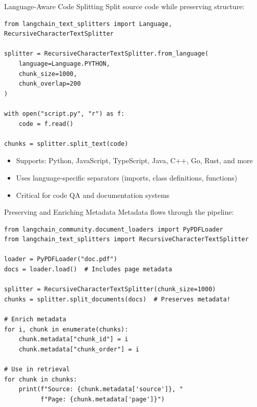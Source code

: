 \documentclass[aspectratio=169,11pt]{beamer}
\begin{document}
\begin{frame}[fragile]{Language-Aware Code Splitting}
  Split source code while preserving structure:
  \begin{lstlisting}
from langchain_text_splitters import Language, RecursiveCharacterTextSplitter

splitter = RecursiveCharacterTextSplitter.from_language(
    language=Language.PYTHON,
    chunk_size=1000,
    chunk_overlap=200
)

with open("script.py", "r") as f:
    code = f.read()

chunks = splitter.split_text(code)
  \end{lstlisting}

  \vspace{0.5cm}
  \begin{itemize}
    \setlength{\itemsep}{1pt}
    \item Supports: Python, JavaScript, TypeScript, Java, C++, Go, Rust, and more
    \item Uses language-specific separators (imports, class definitions, functions)
    \item Critical for code QA and documentation systems
  \end{itemize}
\end{frame}

\begin{frame}[fragile]{Preserving and Enriching Metadata}
  Metadata flows through the pipeline:
  \begin{lstlisting}
from langchain_community.document_loaders import PyPDFLoader
from langchain_text_splitters import RecursiveCharacterTextSplitter

loader = PyPDFLoader("doc.pdf")
docs = loader.load()  # Includes page metadata

splitter = RecursiveCharacterTextSplitter(chunk_size=1000)
chunks = splitter.split_documents(docs)  # Preserves metadata!

# Enrich metadata
for i, chunk in enumerate(chunks):
    chunk.metadata["chunk_id"] = i
    chunk.metadata["chunk_order"] = i

# Use in retrieval
for chunk in chunks:
    print(f"Source: {chunk.metadata['source']}, "
          f"Page: {chunk.metadata['page']}")
  \end{lstlisting}
\end{frame}
\end{document}
